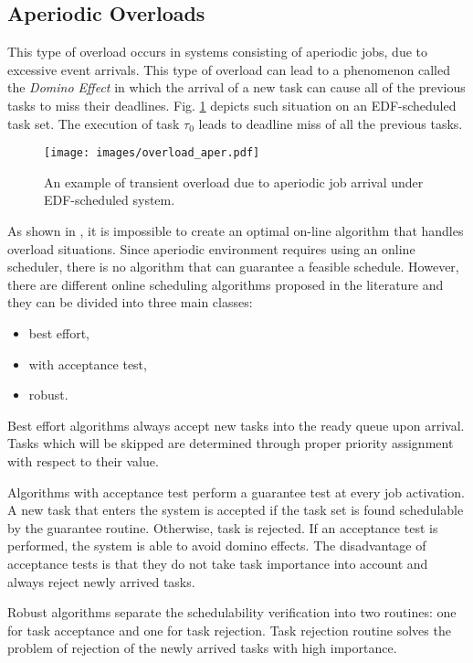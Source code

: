 \subsection{Aperiodic Overloads}
This type of overload occurs in systems consisting of aperiodic jobs, due to excessive event arrivals. 
This type of overload can lead to a phenomenon called the \textit{Domino Effect} in which the arrival of a new task can cause all of the previous tasks to miss their deadlines. 
Fig. \ref{aperiodic} depicts such situation on an EDF-scheduled task set. 
The execution of task $\tau_0$ leads to deadline miss of all the previous tasks.

\begin{figure}[ht]
    \centering
    \texttt{[image: images/overload\_aper.pdf]}
    \caption{An example of transient overload due to aperiodic job arrival under EDF-scheduled system.}
    \label{aperiodic}
\end{figure}

As shown in \cite{buttazzo2011hard}, it is impossible to create an optimal on-line algorithm that handles overload situations.
Since aperiodic environment requires using an online scheduler, there is no algorithm that can guarantee a feasible schedule.
However, there are different online scheduling algorithms proposed in the literature and they can be divided into three main classes:
\begin{itemize}
    \item{best effort,}
    \item{with acceptance test,}
    \item{robust.}
\end{itemize}

Best effort algorithms always accept new tasks into the ready queue upon arrival. Tasks which will be skipped are determined through proper priority assignment with respect to their value.

Algorithms with acceptance test perform a guarantee test at every job activation. 
A new task that enters the system is accepted if the task set is found schedulable by the guarantee routine. Otherwise, task is rejected.
If an acceptance test is performed, the system is able to avoid domino effects.
The disadvantage of acceptance tests is that they do not take task importance into account and always reject newly arrived tasks.

Robust algorithms separate the schedulability verification into two routines: one for task acceptance and one for task rejection. 
Task rejection routine solves the problem of rejection of the newly arrived tasks with high importance.

